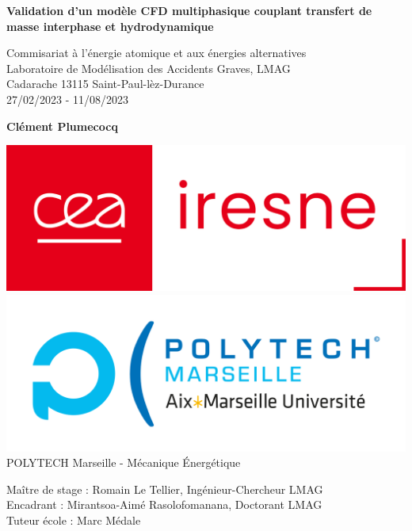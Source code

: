 \documentclass[a4paper,10pt]{report}    %
\begin{document}

\hypersetup{pageanchor=false}
\begin{titlepage}
    \begin{center}
        \vspace*{1cm}

        \Huge
        \textbf{Validation d’un modèle CFD multiphasique couplant transfert de masse interphase et hydrodynamique}

        \vspace{0.5cm}
        \LARGE
        Commisariat à l'énergie atomique et aux énergies alternatives \\
        Laboratoire de Modélisation des Accidents Graves, LMAG\\
        \Large Cadarache 13115 Saint-Paul-lèz-Durance\\
         27/02/2023 - 11/08/2023
        \vspace{1.5cm}

        \textbf{\LARGE Clément Plumecocq}

        \vfill

        \includegraphics[scale=0.15]{logo_iresne.png}\includegraphics[scale=0.20]{polytech.jpg}
        \vfill
        \Large
        \noindent%
        POLYTECH Marseille - Mécanique Énergétique \\ \vfill
	\raggedright 
	\noindent Maître de stage : Romain Le Tellier, Ingénieur-Chercheur LMAG\\
	Encadrant :  Mirantsoa-Aimé Rasolofomanana, Doctorant LMAG \\
	Tuteur école :   Marc Médale 


\end{center}
\end{titlepage}
\end{document}
